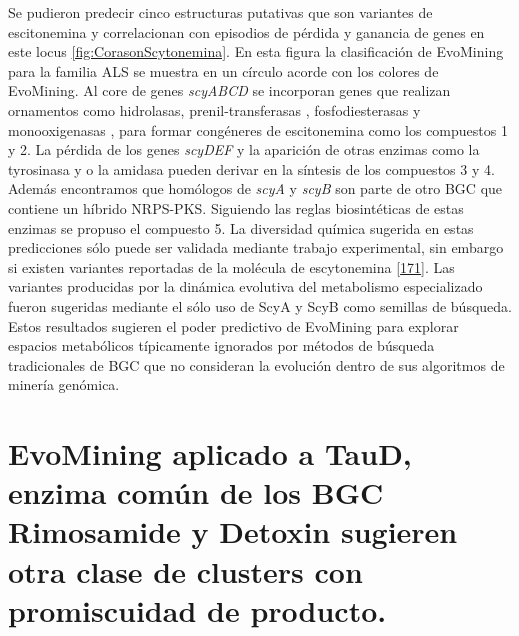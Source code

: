 \documentclass[12pt,twoside]{reedthesis}
\begin{document}
  Se pudieron predecir cinco estructuras putativas que son variantes de
  escitonemina y correlacionan con episodios de pérdida y ganancia de
  genes en este locus \autoref{fig:CorasonScytonemina}. En esta figura la
  clasificación de EvoMining para la familia ALS se muestra en un círculo
  acorde con los colores de EvoMining. Al core de genes \emph{scyABCD} se
  incorporan genes que realizan ornamentos como hidrolasas,
  prenil-transferasas , fosfodiesterasas y monooxigenasas , para formar
  congéneres de escitonemina como los compuestos 1 y 2. La pérdida de los
  genes \emph{scyDEF} y la aparición de otras enzimas como la tyrosinasa y
  o la amidasa pueden derivar en la síntesis de los compuestos 3 y 4.
  Además encontramos que homólogos de \emph{scyA} y \emph{scyB} son parte
  de otro BGC que contiene un híbrido NRPS-PKS. Siguiendo las reglas
  biosintéticas de estas enzimas se propuso el compuesto 5. La diversidad
  química sugerida en estas predicciones sólo puede ser validada mediante
  trabajo experimental, sin embargo si existen variantes reportadas de la
  molécula de escytonemina
  {[}\protect\hyperlink{ref-grant_scytonemin-imine_2013}{171}{]}. Las
  variantes producidas por la dinámica evolutiva del metabolismo
  especializado fueron sugeridas mediante el sólo uso de ScyA y ScyB como
  semillas de búsqueda. Estos resultados sugieren el poder predictivo de
  EvoMining para explorar espacios metabólicos típicamente ignorados por
  métodos de búsqueda tradicionales de BGC que no consideran la evolución
  dentro de sus algoritmos de minería genómica.
  
  \section{EvoMining aplicado a TauD, enzima común de los BGC Rimosamide y
  Detoxin sugieren otra clase de clusters con promiscuidad de
  producto.}\label{evomining-aplicado-a-taud-enzima-comun-de-los-bgc-rimosamide-y-detoxin-sugieren-otra-clase-de-clusters-con-promiscuidad-de-producto.}
  
\end{document}
